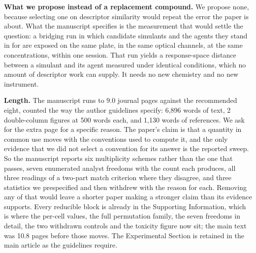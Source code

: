 \documentclass[11pt,letterpaper]{article}
\begin{document}
\textbf{What we propose instead of a replacement compound.} We propose none,
because selecting one on descriptor similarity would repeat the error the
paper is about. What the manuscript specifies is the measurement that would
settle the question: a bridging run in which candidate simulants and the agents
they stand in for are exposed on the same plate, in the same optical channels,
at the same concentrations, within one session. That run yields a response-space
distance between a simulant and its agent measured under identical conditions,
which no amount of descriptor work can supply. It needs no new chemistry and
no new instrument.

\textbf{Length.} The manuscript runs to 9.0 journal pages against the
recommended eight, counted the way the author guidelines specify:
6,896 words of text, 2 double-column figures at 500 words each,
and 1,130 words of references. We ask for the extra page for a specific
reason. The
paper's claim is that a quantity in common use moves with the conventions used
to compute it, and the only evidence that we did not select a convention for
its answer is the reported sweep. So the manuscript reports six multiplicity
schemes rather than the one that passes, seven enumerated analyst freedoms with
the count each produces, all three readings of a two-part match criterion where
they disagree, and three statistics we prespecified and then withdrew with the
reason for each. Removing any of that would leave a shorter paper making a
stronger claim than its evidence supports. Every reducible block is already in
the Supporting Information, which is where the per-cell values, the full
permutation family, the seven freedoms in detail, the two withdrawn controls
and the toxicity figure now sit; the main text was 10.8 pages before those
moves. The Experimental
Section is retained in the main article as the guidelines require.
\end{document}
